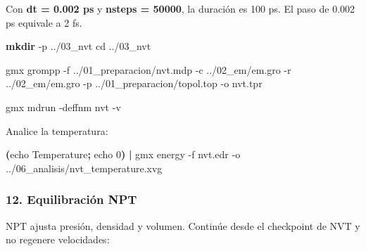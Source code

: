 \documentclass[
  spanish,
  11pt,
  a4paper]{article}
\newenvironment{Shaded}{\begin{snugshade}}{\end{snugshade}}
\newcommand{\AttributeTok}[1]{\textcolor[rgb]{0.13,0.29,0.53}{#1}}
\newcommand{\BuiltInTok}[1]{#1}
\newcommand{\ExtensionTok}[1]{#1}
\newcommand{\FunctionTok}[1]{\textcolor[rgb]{0.13,0.29,0.53}{\textbf{#1}}}
\newcommand{\KeywordTok}[1]{\textcolor[rgb]{0.13,0.29,0.53}{\textbf{#1}}}
\newcommand{\NormalTok}[1]{#1}
\begin{document}
Con \textbf{dt = 0.002 ps} y \textbf{nsteps = 50000}, la duración es 100
ps. El paso de 0.002 ps equivale a 2 fs.

\begin{Shaded}
\begin{Highlighting}[]
\FunctionTok{mkdir} \AttributeTok{{-}p}\NormalTok{ ../03\_nvt}
\BuiltInTok{cd}\NormalTok{ ../03\_nvt}

\ExtensionTok{gmx}\NormalTok{ grompp     }\AttributeTok{{-}f}\NormalTok{ ../01\_preparacion/nvt.mdp     }\AttributeTok{{-}c}\NormalTok{ ../02\_em/em.gro     }\AttributeTok{{-}r}\NormalTok{ ../02\_em/em.gro     }\AttributeTok{{-}p}\NormalTok{ ../01\_preparacion/topol.top     }\AttributeTok{{-}o}\NormalTok{ nvt.tpr}

\ExtensionTok{gmx}\NormalTok{ mdrun }\AttributeTok{{-}deffnm}\NormalTok{ nvt }\AttributeTok{{-}v}
\end{Highlighting}
\end{Shaded}

Analice la temperatura:

\begin{Shaded}
\begin{Highlighting}[]
\KeywordTok{(}\BuiltInTok{echo}\NormalTok{ Temperature}\KeywordTok{;} \BuiltInTok{echo}\NormalTok{ 0}\KeywordTok{)} \KeywordTok{|}
\ExtensionTok{gmx}\NormalTok{ energy     }\AttributeTok{{-}f}\NormalTok{ nvt.edr     }\AttributeTok{{-}o}\NormalTok{ ../06\_analisis/nvt\_temperature.xvg}
\end{Highlighting}
\end{Shaded}

\subsubsection{12. Equilibración NPT}\label{equilibraciuxf3n-npt-1}

NPT ajusta presión, densidad y volumen. Continúe desde el checkpoint de
NVT y no regenere velocidades:
\end{document}
